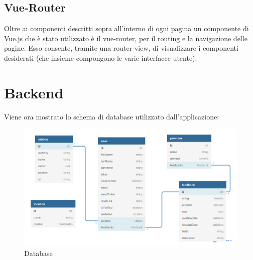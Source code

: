 \subsection{Vue-Router}
Oltre ai componenti descritti sopra all'interno di ogni pagina un componente di Vue.js che è stato utilizzato è il vue-router, per il routing e la navigazione delle pagine.
Esso consente, tramite una router-view, di visualizzare i componenti
desiderati (che insieme compongono le varie interfacce utente).
\section{Backend}
Viene ora mostrato lo schema di database utilizzato dall'applicazione:
\begin{figure}[H]
    \caption{Database}
    \label{fig:Database}
    \centering
    \includegraphics[width=1.0\textwidth]{DrawIo/database.png}
\end{figure}
